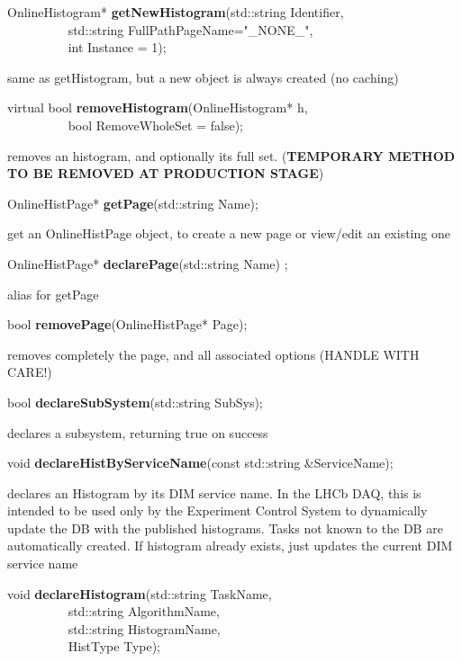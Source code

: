 \item    OnlineHistogram* {\bf getNewHistogram}(std::string Identifier,\\\mbox{}~~~~~~~~~
				   std::string FullPathPageName="\_NONE\_",\\\mbox{}~~~~~~~~~
				   int Instance = 1);

 same as getHistogram, but a new object is always created (no caching)


\item    virtual bool {\bf removeHistogram}(OnlineHistogram* h,\\\mbox{}~~~~~~~~~
			       bool RemoveWholeSet = false);

 removes an histogram, and optionally its full set. 
 ({\bf TEMPORARY METHOD TO BE REMOVED AT PRODUCTION STAGE})


\item    OnlineHistPage* {\bf getPage}(std::string Name);


 get an OnlineHistPage object, to create a new page or view/edit an existing one


\item    OnlineHistPage* {\bf declarePage}(std::string Name) ;

 alias for getPage


\item    bool {\bf removePage}(OnlineHistPage* Page);


 removes completely the page, and all associated options (HANDLE WITH CARE!)


\item    bool {\bf declareSubSystem}(std::string SubSys);


 declares a  subsystem, returning true on success


\item    void {\bf declareHistByServiceName}(const std::string \&ServiceName);


 declares an Histogram by its DIM service name. In the LHCb
 DAQ, this is intended to be used only by the Experiment Control
 System to dynamically update the DB with the published histograms.
 Tasks not known to the DB are automatically created.
 If histogram already exists, just updates the current DIM service name 


\item    void {\bf declareHistogram}(std::string TaskName,\\\mbox{}~~~~~~~~~
			std::string AlgorithmName,\\\mbox{}~~~~~~~~~
			std::string HistogramName,\\\mbox{}~~~~~~~~~
			HistType Type);


